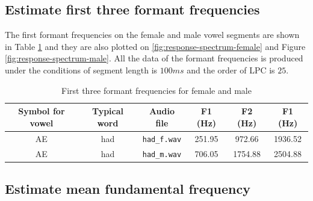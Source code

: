 \documentclass{article}
\begin{document}


\subsection{Estimate first three formant frequencies}

The first formant frequencies on the female and male vowel segments are shown in Table \ref{table:formant-frequency} and they are also plotted on \ref{fig:response-spectrum-female} and Figure \ref{fig:response-spectrum-male}. All the data of the formant frequencies is produced under the conditions of segment length is $100ms$ and the order of LPC is $25$.

\begin{table}[h]
\caption{First three formant frequencies for female and male} %
\centering %
\begin{tabular}{c c c c c c} %
\hline\hline %
Symbol for vowel & Typical word & Audio file & F1 (Hz) & F2 (Hz) & F1 (Hz) \\ [0.5ex] %
\hline %
AE & had & \verb+had_f.wav+ & 251.95 & 972.66 & 1936.52 \\ %
AE & had & \verb+had_m.wav+ & 706.05 & 1754.88 & 2504.88 \\ [1ex] %
\hline %
\end{tabular}
\label{table:formant-frequency}
\end{table}

\subsection{Estimate mean fundamental frequency}
\end{document}
